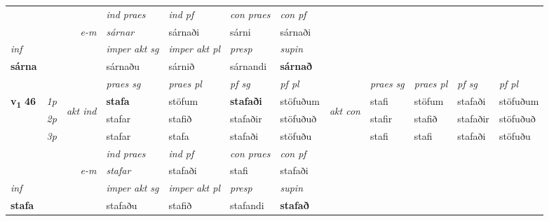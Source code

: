 \begin{longtable}[l]{X>{\footnotesize\itshape}llXXXXlXXXX}
   && &  \textit{ind praes} & \textit{ind pf} & \textit{con praes} & \textit{con pf} \\*
\multicolumn{3}{r}{\textit{e-m}} & sárnar & sárnaði & sárni & sárnaði \\*

\cmidrule{4-7}
   {\textit{inf}} & &  & \textit{imper akt sg} & \textit{imper akt pl}   & \textit{presp} & \textit{supin}   \\*
  {\textbf{sárna}} & && sárnaðu  & sárnið   & sárnandi &  \textbf{sárnað}   \\*

\midrule

 & &   & \textit{praes sg}  & \textit{praes pl}    & \textit{ pf sg} & \textit{pf pl} & & \textit{praes sg}  & \textit{praes pl}    & \textit{pf sg} & \textit{pf pl }  \\ \cmidrule{4-7} \cmidrule{9-12}
 \multirow{2}{*}{{{\textbf{v{\textsubscript{1}}} \Large{\textbf{46}}}}}  & 1p & \multirow{3}{*}{\begin{turn}{90}\textit{akt ind}\end{turn}} & \textbf{stafa} & stöfum & \textbf{stafaði} & stöfuðum & \multirow{3}{*}{\begin{turn}{90}\textit{akt con}\end{turn}} &stafi & stöfum & stafaði & stöfuðum\\*
 & 2p &  &  stafar  & stafið & stafaðir & stöfuðuð & & stafir & stafið & stafaðir & stöfuðuð \\*
 & 3p &  & stafar & stafa & stafaði & stöfuðu & & stafi & stafi& stafaði & stöfuðu \\*
\cmidrule{4-7} \cmidrule{9-12}

   && &  \textit{ind praes} & \textit{ind pf} & \textit{con praes} & \textit{con pf} \\*
\multicolumn{3}{r}{\textit{e-m}} & stafar & stafaði & stafi & stafaði \\*

\cmidrule{4-7}
   {\textit{inf}} & &  & \textit{imper akt sg} & \textit{imper akt pl}   & \textit{presp} & \textit{supin}   \\*
  {\textbf{stafa}} & && stafaðu  & stafið   & stafandi &  \textbf{stafað}   \\*

\midrule


\end{longtable}
